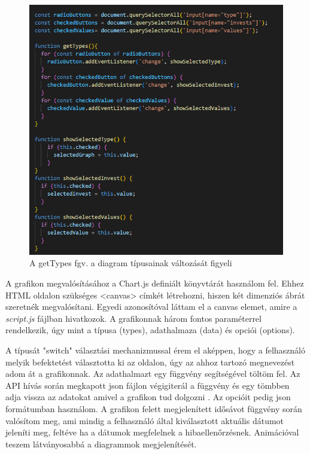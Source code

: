 \begin{figure}[h]
\centering
\includegraphics[scale=0.5]{images/types.png}
\caption{A getTypes fgv. a diagram típusainak változását figyeli}
\label{fig:fetch}
\end{figure}

A grafikon megvalósításához a Chart.js definiált könyvtárát használom fel. Ehhez HTML oldalon szükséges <canvas> címkét létrehozni, hiszen két dimenziós ábrát szeretnék megvalósítani. Egyedi azonosítóval láttam el a canvas elemet, amire a \emph{script.js} fájlban hivatkozok. A grafikonnak három fontos paraméterrel rendelkezik, úgy mint a típusa (types), adathalmaza (data) és opciói (options).

	A típusát "switch" választási mechanizmussal érem el aképpen, hogy a felhasználó melyik befektetést választotta ki az oldalon, úgy az ahhoz tartozó megnevezést adom át a grafikonnak. 
Az adathalmazt egy függvény segítségével töltöm fel. Az API hívás során megkapott json fájlon végigiterál a függvény és egy tömbben adja vissza az adatokat amivel a grafikon tud dolgozni . Az opcióit pedig json formátumban használom. A grafikon felett megjelenített idősávot függvény során valósítom meg, ami mindig a felhasználó által kiválasztott aktuális dátumot jeleníti meg, feltéve ha a dátumok megfelelnek a hibaellenőrzésnek. Animációval teszem látványosabbá a diagrammok megjelenítését.

